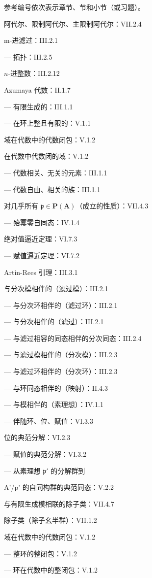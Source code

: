 
参考编号依次表示章节、节和小节（或习题）。

阿代尔、限制阿代尔、主限制阿代尔：VII.2.4

m-进滤过：III.2.1

--- 拓扑：III.2.5

\(n\)-进整数：III.2.12

Azumaya 代数：II.1.7

--- 有限生成的：III.1.1

--- 在环上整且有限的：V.1.1

域在代数中的代数闭包：V.1.2

在代数中代数闭的域：V.1.2

--- 代数相关、无关的元素：III.1.1

--- 代数自由、相关的族：III.1.1

对几乎所有 \(\mathfrak{p} \in \mathbf{P}(\mathbf{A})\)（成立的性质）：VII.4.3

--- 殆幂零自同态：IV.1.4

绝对值逼近定理：VI.7.3

--- 赋值逼近定理：VI.7.2

Artin-Rees 引理：III.3.1

与分次模相伴的（滤过模）：III.2.1

--- 与分次环相伴的（滤过环）：III.2.1

--- 与分次相伴的（滤过）：III.2.1

--- 与滤过相容的同态相伴的分次同态：III.2.4

--- 与滤过模相伴的（分次模）：III.2.3

--- 与滤过环相伴的（分次环）：III.2.3

--- 与环同态相伴的（映射）：II.4.3

--- 与模相伴的（素理想）：IV.1.1

--- 伴随环、位、赋值：VI.3.3

位的典范分解：VI.2.3

--- 赋值的典范分解：VI.3.2

--- 从素理想 \(\mathfrak{p}'\) 的分解群到

A'/p' 的自同构群的典范同态：V.2.2

与有限生成模相联的除子类：VII.4.7

除子类（除子幺半群）：VII.1.2

域在代数中的代数闭包：V.1.2

--- 整环的整闭包：V.1.2

--- 环在代数中的整闭包：V.1.2

